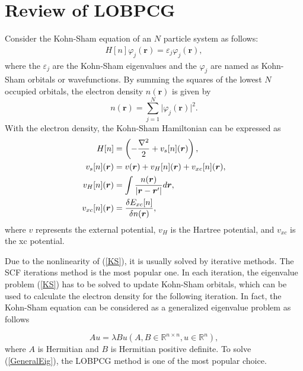\documentclass[12pt]{article}
\numberwithin{figure}{section}
\numberwithin{table}{section}
\begin{document}
\section{Review of LOBPCG}
Consider the Kohn-Sham equation of an $N$ particle system as follows:
\begin{equation}
\begin{aligned}
	\label{KS}
	H[n]\varphi_j(\boldsymbol{r})  = \varepsilon_j \varphi_j(\boldsymbol{r}),
\end{aligned}
\end{equation}
where the $\varepsilon_j$ are the Kohn-Sham eigenvalues and the $\varphi_j$ are named as Kohn-Sham orbitals or wavefunctions. By summing the squares of the lowest $N$ occupied orbitals, the electron density $n(\boldsymbol{r})$ is given by
\begin{equation}
	n(\boldsymbol{r}) = \sum_{j=1}^N \vert\varphi_j(\boldsymbol{r})\vert^2.
\end{equation}
With the electron density, the Kohn-Sham Hamiltonian can be expressed as
\begin{equation}
\begin{aligned}
	H[n]&=\left(-\frac{\nabla^2}{2}+v_s[n](\boldsymbol{r})\right),\\
	\centering v_s[n](\boldsymbol{r})& = v(\boldsymbol{r}) +v_{H}[n](\boldsymbol{r})+v_{xc}[n](\boldsymbol{r}),\\
	v_{H}[n](\boldsymbol{r})&=\int \frac{n(\boldsymbol{r})}{\vert \boldsymbol{r}- \boldsymbol{r}' \vert}d\boldsymbol{r},\\
	v_{xc}[n](\boldsymbol{r})&=\frac{\delta E_{xc}[n]}{\delta n(\boldsymbol{r})},
\end{aligned}
\end{equation}
where $v$ represents the external potential, $v_H$ is the Hartree potential, and $v_{xc}$ is the xc potential.

Due to the nonlinearity of (\ref{KS}), it is usually solved by iterative methods.  The SCF iterations method is the most popular one. In each iteration, the eigenvalue problem (\ref{KS}) has to be solved to update Kohn-Sham orbitals, which can be used to calculate the electron density for the following iteration. In fact, the Kohn-Sham equation can be considered as a generalized eigenvalue problem as follows

\begin{equation}
	\label{GeneralEig}
	A u = \lambda Bu(A,B\in\mathbb{R}^{n\times n}, u\in \mathbb{R}^n),
\end{equation}
where $A$ is Hermitian and $B$ is Hermitian positive definite. To solve (\ref{GeneralEig}), the LOBPCG method is one of the most popular choice. 
\end{document}
